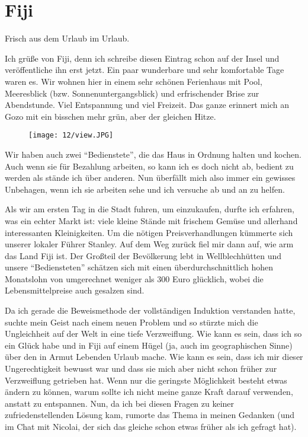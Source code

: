 \chapter{Fiji}

Frisch aus dem Urlaub im Urlaub.

Ich grüße von Fiji, denn ich schreibe diesen Eintrag schon auf der
Insel und veröffentliche ihn erst jetzt.  Ein paar wunderbare und
sehr komfortable Tage waren es. Wir wohnen hier in einem sehr schönen
Ferienhaus mit Pool, Meeresblick (bzw.  Sonnenuntergangsblick) und
erfrischender Brise zur Abendstunde. Viel Entspannung und viel
Freizeit. Das ganze erinnert mich an Gozo mit ein bisschen mehr grün,
aber der gleichen Hitze.
\begin{figure}[h]
  \centering
  \texttt{[image: 12/view.JPG]}
\end{figure}

Wir haben auch zwei ``Bedienstete'', die das Haus in Ordnung halten
und kochen. Auch wenn sie für Bezahlung arbeiten, so kann ich es doch
nicht ab, bedient zu werden als stände ich über anderen. Nun überfällt
mich also immer ein gewisses Unbehagen, wenn ich sie arbeiten sehe und
ich versuche ab und an zu helfen.

Als wir am ersten Tag in die Stadt fuhren, um einzukaufen, durfte ich
erfahren, was ein echter Markt ist: viele kleine Stände mit frischem
Gemüse und allerhand interessanten Kleinigkeiten. Um die nötigen
Preisverhandlungen kümmerte sich unserer lokaler Führer Stanley. Auf
dem Weg zurück fiel mir dann auf, wie arm das Land Fiji ist. Der
Großteil der Bevölkerung lebt in Wellblechhütten und unsere
``Bediensteten'' schätzen sich mit einen überdurchschnittlich hohen
Monatslohn von umgerechnet weniger als 300 Euro glücklich, wobei die
Lebensmittelpreise auch gesalzen sind.

Da ich gerade die Beweismethode der vollständigen Induktion verstanden
hatte, suchte mein Geist nach einem neuen Problem und so stürzte mich
die Ungleichheit auf der Welt in eine tiefe Verzweiflung. Wie kann es
sein, dass ich so ein Glück habe und in Fiji auf einem Hügel (ja, auch
im geographischen Sinne) über den in Armut Lebenden Urlaub mache. Wie
kann es sein, dass ich mir dieser Ungerechtigkeit bewusst war und dass
sie mich aber nicht schon früher zur Verzweiflung getrieben hat. Wenn
nur die geringste Möglichkeit besteht etwas ändern zu können, warum
sollte ich nicht meine ganze Kraft darauf verwenden, anstatt zu
entspannen. Nun, da ich bei diesen Fragen zu keiner
zufriedenstellenden Lösung kam, rumorte das Thema in meinen Gedanken
(und im Chat mit Nicolai, der sich das gleiche schon etwas früher als
ich gefragt hat).

